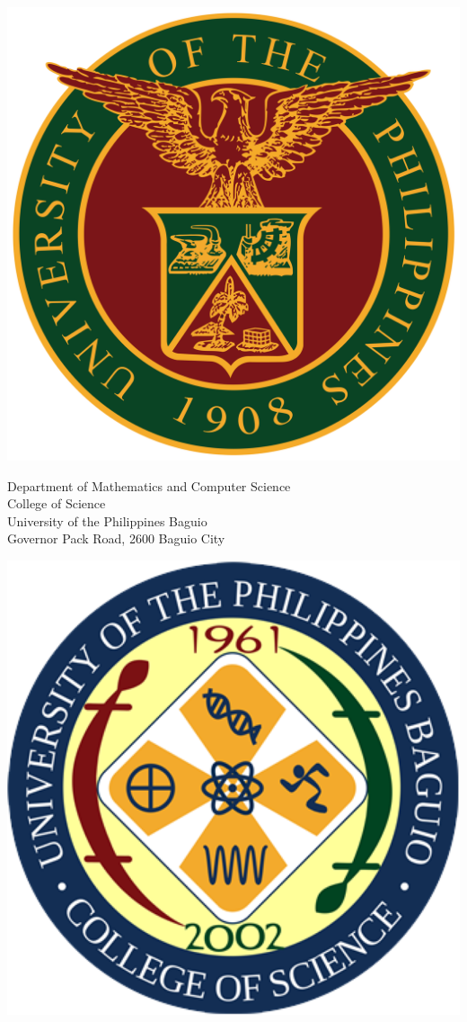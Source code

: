 \documentclass[a4paper, 12pt]{report}
\begin{document}
	\vspace*{\fill}
	\centering
	\begin{minipage}{0.2\textwidth}\flushright
		\includegraphics[height=2.5 cm, width=2.5 cm]{updlogo.png}
	\end{minipage}%
 	\begin{minipage}{0.6 \textwidth}	\centering
	Department of Mathematics and Computer Science\\
	College of Science\\
    University of the Philippines Baguio\\
    Governor Pack Road, 2600 Baguio City
	\end{minipage}%
	\begin{minipage}{0.2\textwidth}
	\includegraphics[height=2.5 cm, width=2.5 cm]{cslogo.png}
	\end{minipage}
    \bigskip


 
\end{document}
